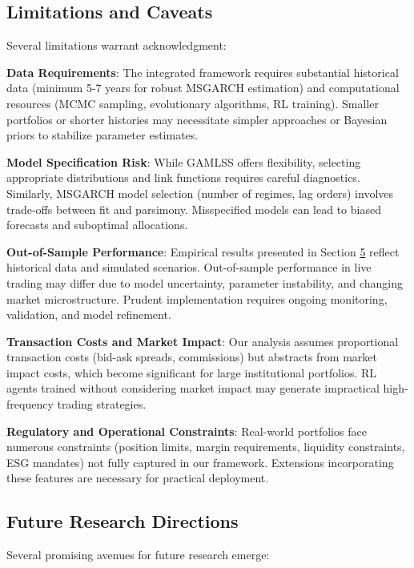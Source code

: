 \documentclass[
  10pt,
  a4paper,
]{article}
\begin{document}
\subsection{Limitations and Caveats}\label{sec-discussion-limitations}

Several limitations warrant acknowledgment:

\textbf{Data Requirements}: The integrated framework requires
substantial historical data (minimum 5-7 years for robust MSGARCH
estimation) and computational resources (MCMC sampling, evolutionary
algorithms, RL training). Smaller portfolios or shorter histories may
necessitate simpler approaches or Bayesian priors to stabilize parameter
estimates.

\textbf{Model Specification Risk}: While GAMLSS offers flexibility,
selecting appropriate distributions and link functions requires careful
diagnostics. Similarly, MSGARCH model selection (number of regimes, lag
orders) involves trade-offs between fit and parsimony. Misspecified
models can lead to biased forecasts and suboptimal allocations.

\textbf{Out-of-Sample Performance}: Empirical results presented in
Section \hyperref[sec-results]{5} reflect historical data and simulated
scenarios. Out-of-sample performance in live trading may differ due to
model uncertainty, parameter instability, and changing market
microstructure. Prudent implementation requires ongoing monitoring,
validation, and model refinement.

\textbf{Transaction Costs and Market Impact}: Our analysis assumes
proportional transaction costs (bid-ask spreads, commissions) but
abstracts from market impact costs, which become significant for large
institutional portfolios. RL agents trained without considering market
impact may generate impractical high-frequency trading strategies.

\textbf{Regulatory and Operational Constraints}: Real-world portfolios
face numerous constraints (position limits, margin requirements,
liquidity constraints, ESG mandates) not fully captured in our
framework. Extensions incorporating these features are necessary for
practical deployment.

\subsection{Future Research Directions}\label{sec-discussion-future}

Several promising avenues for future research emerge:
\end{document}
